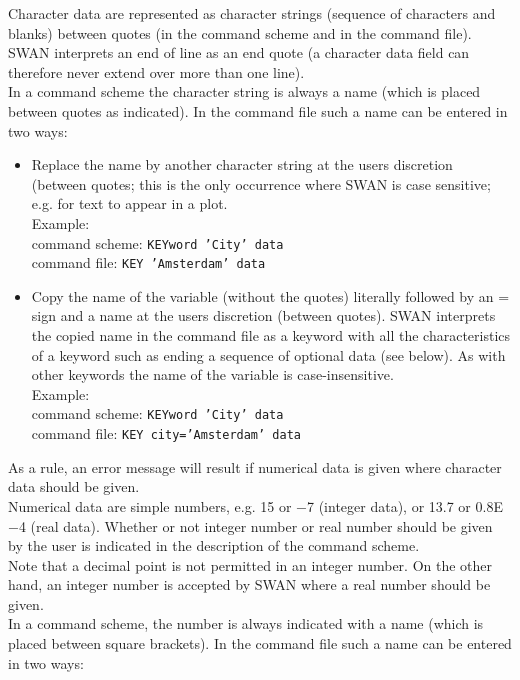 \documentclass[12pt]{book}
\begin{document}
Character data are represented as character strings (sequence of characters and blanks) between quotes (in the command scheme
and in the command file). SWAN interprets an end of line as an end quote (a character data field can therefore never extend over
more than one line).
\\[2ex]
\noindent
In a command scheme the character string is always a name (which is placed between quotes as indicated). In the command file such
a name can be entered in two ways:
\begin{itemize}
  \item Replace the name by another character string at the users discretion (between quotes; this is the only occurrence where
        SWAN is case sensitive; e.g. for text to appear in a plot.\\
        Example:\\
        command scheme: {\tt KEYword 'City' data}\\
        command file: {\tt KEY 'Amsterdam' data}
  \item Copy the name of the variable (without the quotes) literally followed by an = sign and a name at the users discretion
        (between quotes). SWAN interprets the copied name in the command file as a keyword with all the characteristics of a keyword
        such as ending a sequence of optional data (see below). As with other keywords the name of the variable is case-insensitive.\\
        Example:\\
        command scheme: {\tt KEYword 'City' data}\\
        command file: {\tt KEY city='Amsterdam' data}
\end{itemize}
As a rule, an error message will result if numerical data is given where character data should be given.
\\[2ex]
\noindent
Numerical data are simple numbers, e.g. 15 or $-$7 (integer data), or 13.7 or 0.8E$-$4 (real data). Whether or not integer number or
real number should be given by the user is indicated in the description of the command scheme.
\\[2ex]
\noindent
Note that a decimal point is not permitted in an integer number. On the other hand, an integer number is accepted by SWAN where a real
number should be given.
\\[2ex]
\noindent
In a command scheme, the number is always indicated with a name (which is placed  between square brackets). In the command file such a
name can be entered in two ways:
\end{document}
